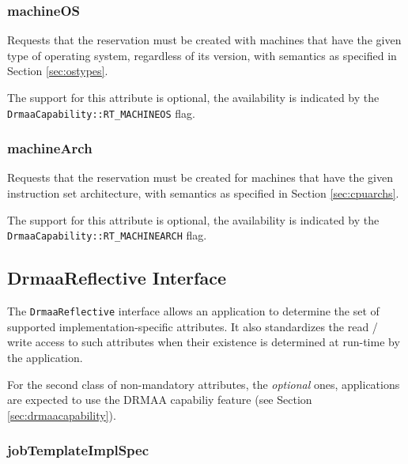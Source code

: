 \documentclass{article}
\newcommand{\h}[1]{\lstinline|#1|}
\newcommand{\rat}[1]{}
\begin{document}
\rat{May 18th 2011 conf call identified the different understandings of memory reservation.}

\subsubsection{machineOS}

Requests that the reservation must be created with machines that have the given type of operating system, regardless of its version, with semantics as specified in Section \ref{sec:ostypes}.

The support for this attribute is optional, the availability is indicated by the \h{DrmaaCapability::RT_MACHINEOS} flag.

\rat{May 18th 2011 conf call identified support in DRM systems to be mainly given by additional configuration only.}

\subsubsection{machineArch}

Requests that the reservation must be created for machines that have the given instruction set architecture,  with semantics as specified in Section \ref{sec:cpuarchs}. 

The support for this attribute is optional, the availability is indicated by the \h{DrmaaCapability::RT_MACHINEARCH} flag. 

\rat{May 18th 2011 conf call identified support in DRM systems to be mainly given by additional configuration only.}

\subsection{DrmaaReflective Interface}
\label{sec:drmaareflective}

The \h{DrmaaReflective} interface allows an application to determine the set of supported implementation-specific attributes. It also standardizes the read / write access to such attributes when their existence is determined at run-time by the application. 

For the second class of non-mandatory attributes, the \emph{optional} ones, applications are expected to use the DRMAA capabiliy feature (see Section \ref{sec:drmaacapability}).



\subsubsection{jobTemplateImplSpec}
\end{document}
